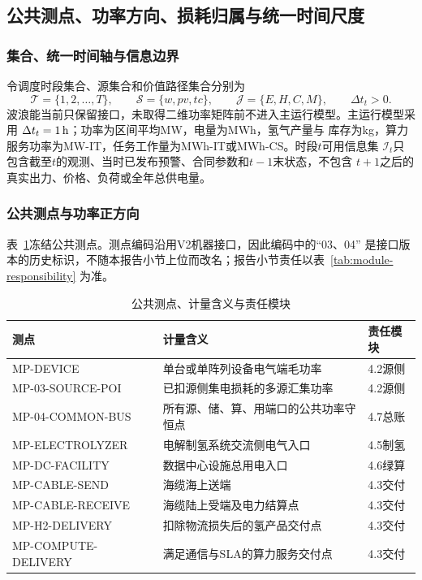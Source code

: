 \subsection{公共测点、功率方向、损耗归属与统一时间尺度}

\subsubsection{集合、统一时间轴与信息边界}

令调度时段集合、源集合和价值路径集合分别为
\begin{equation}
\mathcal T=\{1,2,\ldots,T\},\qquad
\mathcal S=\{w,pv,tc\},\qquad
\mathcal J=\{E,H,C,M\},\qquad \Delta t_t>0.
\label{eq:common-sets}
\end{equation}
波浪能当前只保留接口，未取得二维功率矩阵前不进入主运行模型。主运行模型采用
$\Delta t_t=1\,\mathrm{h}$\assumptiontag；功率为区间平均MW，电量为MWh，氢气产量与
库存为kg，算力服务功率为MW-IT，任务工作量为MWh-IT或MWh-CS。时段$t$可用信息集
$\mathcal I_t$只包含截至$t$的观测、当时已发布预警、合同参数和$t-1$末状态，不包含
$t+1$之后的真实出力、价格、负荷或全年总供电量。

\subsubsection{公共测点与功率正方向}

表~\ref{tab:meter-points}冻结公共测点。测点编码沿用V2机器接口，因此编码中的“03、04”
是接口版本的历史标识，不随本报告小节上位而改名；报告小节责任以表~\ref{tab:module-responsibility}
为准。

\begin{table}[H]
\centering
\footnotesize
\caption{公共测点、计量含义与责任模块}
\label{tab:meter-points}
\begin{tabularx}{\textwidth}{>{\ttfamily\raggedright\arraybackslash}p{4.0cm} X p{2.5cm}}
\toprule
测点 & 计量含义 & 责任模块 \\
\midrule
MP-DEVICE & 单台或单阵列设备电气端毛功率 & 4.2源侧 \\
MP-03-SOURCE-POI & 已扣源侧集电损耗的多源汇集功率 & 4.2源侧 \\
MP-04-COMMON-BUS & 所有源、储、算、用端口的公共功率守恒点 & 4.7总账 \\
MP-ELECTROLYZER & 电解制氢系统交流侧电气入口 & 4.5制氢 \\
MP-DC-FACILITY & 数据中心设施总用电入口 & 4.6绿算 \\
MP-CABLE-SEND & 海缆海上送端 & 4.3交付 \\
MP-CABLE-RECEIVE & 海缆陆上受端及电力结算点 & 4.3交付 \\
MP-H2-DELIVERY & 扣除物流损失后的氢产品交付点 & 4.3交付 \\
MP-COMPUTE-DELIVERY & 满足通信与SLA的算力服务交付点 & 4.3交付 \\
\bottomrule
\end{tabularx}
\end{table}


